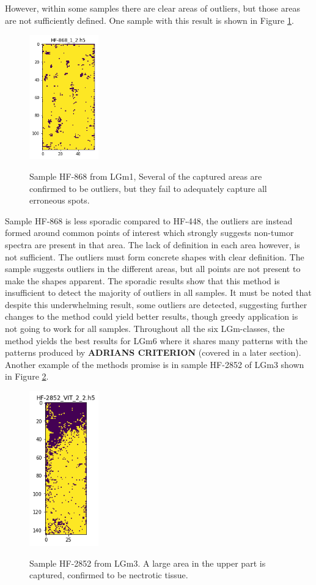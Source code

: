 However, within some samples there are clear areas of outliers, but those areas are not sufficiently defined. One sample with this result is shown in Figure \ref{fig:stdHF868}.

\begin{figure}[H]
	\centering
{\includegraphics[width=3cm]{images/STDtest/LGm-1/HF-868_1_2.h5_0.png} }
\caption{Sample HF-868 from LGm1, Several of the captured areas are confirmed to be outliers, but they fail to adequately capture all erroneous spots.
\label{fig:stdHF868}}

\end{figure}

Sample HF-868 is less sporadic compared to HF-448, the outliers are instead formed around common points of interest which strongly suggests non-tumor spectra are present in that area. The lack of definition in each area however, is not sufficient. The outliers must form concrete shapes with clear definition. The sample suggests outliers in the different areas, but all points are not present to make the shapes apparent. 
The sporadic results show that this method is insufficient to detect the majority of outliers in all samples. It must be noted that despite this underwhelming result, some outliers are detected, suggesting further changes to the method could yield better results, though greedy application is not going to work for all samples. Throughout all the six LGm-classes, the method yields the best results for LGm6 where it shares many patterns with the patterns produced by \textbf{ADRIANS CRITERION} (covered in a later section). Another example of the methods promise is in sample HF-2852 of LGm3 shown in Figure \ref{fig:stdHF2852}.

\begin{figure}[H]
	\centering
{\includegraphics[width=3cm]{images/STDtest/LGm-3/HF-2852_VIT_2_2.h5_6.png} }
\caption{Sample HF-2852 from LGm3. A large area in the upper part is captured, confirmed to be nectrotic tissue.
\label{fig:stdHF2852}}

\end{figure}

